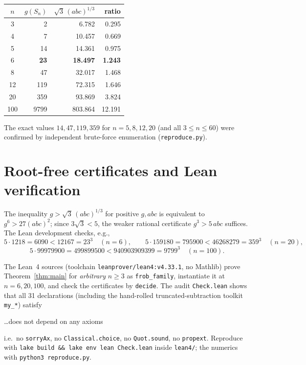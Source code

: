 \documentclass[11pt]{article}
\begin{document}
\begin{center}
\begin{tabular}{crrr}
$n$ & $g(S_n)$ & $\sqrt3\,(abc)^{1/3}$ & ratio\\
\hline
3 & 2 & 6.782 & 0.295\\
4 & 7 & 10.457 & 0.669\\
5 & 14 & 14.361 & 0.975\\
6 & \textbf{23} & \textbf{18.497} & \textbf{1.243}\\
8 & 47 & 32.017 & 1.468\\
12 & 119 & 72.315 & 1.646\\
20 & 359 & 93.869 & 3.824\\
100 & 9799 & 803.864 & 12.191\\
\end{tabular}
\end{center}

The exact values $14,47,119,359$ for $n=5,8,12,20$ (and all $3\le n\le 60$)
were confirmed by independent brute-force enumeration
(\texttt{reproduce.py}).

\section{Root-free certificates and Lean verification}

The inequality $g>\sqrt3\,(abc)^{1/3}$ for positive $g,abc$ is equivalent to
$g^6>27(abc)^2$; since $3\sqrt3<5$, the weaker rational certificate
$g^3>5\,abc$ suffices. The Lean development checks, e.g.,
\[
5\cdot 1218=6090<12167=23^3\quad(n=6),\qquad
5\cdot 159180=795900<46268279=359^3\quad(n=20),
\]
\[
5\cdot 99979900=499899500<940903909399=9799^3\quad(n=100).
\]

The Lean~4 sources (toolchain \texttt{leanprover/lean4:v4.33.1}, no Mathlib)
prove Theorem~\ref{thm:main} for \emph{arbitrary} $n\ge3$ as
\texttt{frob\_family}, instantiate it at $n=6,20,100$, and check the
certificates by \texttt{decide}. The audit \texttt{Check.lean} shows that all
31 declarations (including the hand-rolled truncated-subtraction toolkit
\texttt{my\_*}) satisfy
\begin{center}\ttfamily
\ldots does not depend on any axioms
\end{center}
i.e.\ no \texttt{sorryAx}, no \texttt{Classical.choice}, no
\texttt{Quot.sound}, no \texttt{propext}. Reproduce with
\texttt{lake build \&\& lake env lean Check.lean} inside \texttt{lean4/};
the numerics with \texttt{python3 reproduce.py}.
\end{document}
